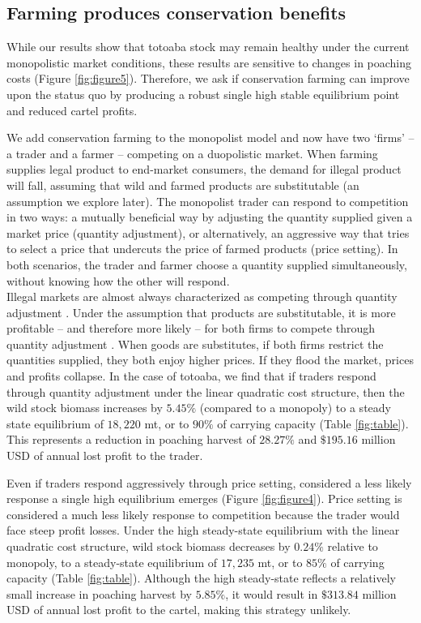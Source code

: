 \subsection{Farming produces conservation benefits}

While our results show that totoaba stock may remain healthy under the current monopolistic market conditions, these results are sensitive to changes in poaching costs (Figure \ref{fig:figure5}). Therefore, we ask if conservation farming can improve upon the status quo by producing a robust single high stable equilibrium point and reduced cartel profits.

We add conservation farming to the monopolist model and now have two ‘firms’ – a trader and a farmer – competing on a duopolistic market. When farming supplies legal product to end-market consumers, the demand for illegal product will fall, assuming that wild and farmed products are substitutable (an assumption we explore later). The monopolist trader can respond to competition in two ways: a mutually beneficial way by adjusting the quantity supplied given a market price (quantity adjustment), or alternatively, an aggressive way that tries to select a price that undercuts the price of farmed products (price setting). In both scenarios, the trader and farmer choose a quantity supplied simultaneously, without knowing how the other will respond. 
\\
Illegal markets are almost always characterized as competing through quantity adjustment \citep{poret_optimal_2009, flores_violence_2016}. Under the assumption that products are substitutable, it is more profitable – and therefore more likely – for both firms to compete through quantity adjustment \citep{singh_price_1984}. When goods are substitutes, if both firms restrict the quantities supplied, they both enjoy higher prices. If they flood the market, prices and profits collapse. In the case of totoaba, we find that if traders respond through quantity adjustment under the linear quadratic cost structure, then the wild stock biomass increases by $5.45\%$ (compared to a monopoly) to a steady state equilibrium of $18,220$ mt, or to $90\%$ of carrying capacity (Table \ref{fig:table}). This represents a reduction in poaching harvest of $28.27\%$ and $\$195.16$ million USD of annual lost profit to the trader.

Even if traders respond aggressively through price setting, considered a less likely response \citep{singh_price_1984} a single high equilibrium emerges (Figure \ref{fig:figure4}). Price setting is considered a much less likely response to competition because the trader would face steep profit losses. Under the high steady-state equilibrium with the linear quadratic cost structure, wild stock biomass decreases by $0.24\%$ relative to monopoly, to a steady-state equilibrium of $17,235$ mt, or to $85\%$ of carrying capacity (Table \ref{fig:table}). Although the high steady-state reflects a relatively small increase in poaching harvest by $5.85\%$, it would result in $\$313.84$ million USD of annual lost profit to the cartel, making this strategy unlikely. 

